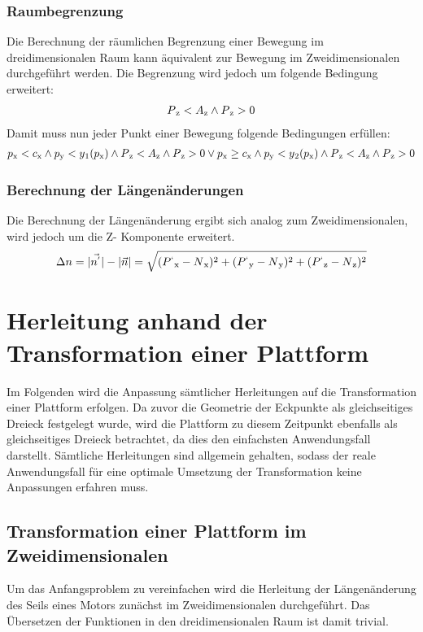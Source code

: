 \documentclass[a4paper, 12pt]{article}
\begin{document}
			\subsubsection{Raumbegrenzung}
				Die Berechnung der räumlichen Begrenzung einer Bewegung im dreidimensionalen Raum kann äquivalent zur Bewegung im Zweidimensionalen durchgeführt werden. Die Begrenzung wird jedoch um folgende Bedingung erweitert:
				\begin{align}
					P\textsubscript{z}<A\textsubscript{z}\land P\textsubscript{z}>0
				\end{align}
					Damit muss nun jeder Punkt einer Bewegung folgende Bedingungen erfüllen:
				\begin{align}
					p\textsubscript{x}<c\textsubscript{x} 
					\land 	p\textsubscript{y}<y\textsubscript{1}(p\textsubscript{x})
					\land	P\textsubscript{z}<A\textsubscript{z}
					\land 	P\textsubscript{z}>0 
					\lor
					p\textsubscript{x} \geq c\textsubscript{x} 
					\land 	p\textsubscript{y}<y\textsubscript{2}(p\textsubscript{x})
					\land	P\textsubscript{z}<A\textsubscript{z}
					\land 	P\textsubscript{z}>0
				\end{align}
			\subsubsection{Berechnung der Längenänderungen}
				Die Berechnung der Längenänderung ergibt sich analog zum Zweidimensionalen, wird jedoch um die Z- Komponente erweitert.
				\begin{align}
					\Delta n =
					|\vec{n^{'}}|-|\vec{n}|=
					\sqrt	{
							(P^{`}\textsubscript{x}-N\textsubscript{x})^2+
							(P^{`}\textsubscript{y}-N\textsubscript{y})^2+
							(P^{`}\textsubscript{z}-N\textsubscript{z})^2
							}
				\end{align}	
				\pagebreak
	\section{Herleitung anhand der Transformation einer Plattform}
		Im Folgenden wird die Anpassung sämtlicher Herleitungen auf die Transformation einer Plattform erfolgen. Da zuvor die Geometrie der Eckpunkte als gleichseitiges Dreieck festgelegt wurde, wird die Plattform zu diesem Zeitpunkt ebenfalls als gleichseitiges Dreieck betrachtet, da dies den einfachsten Anwendungsfall darstellt. Sämtliche Herleitungen sind allgemein gehalten, sodass der reale Anwendungsfall für eine optimale Umsetzung der Transformation keine Anpassungen erfahren muss.
		\subsection{Transformation einer Plattform im Zweidimensionalen}
			Um das Anfangsproblem zu vereinfachen wird die Herleitung der Längenänderung des Seils eines Motors zunächst im Zweidimensionalen durchgeführt. Das Übersetzen der Funktionen in den dreidimensionalen Raum ist damit trivial.
			\pagebreak
\end{document}
